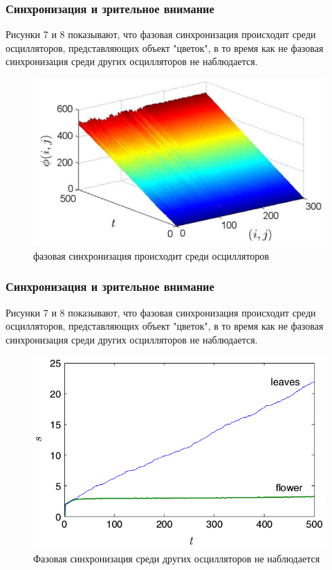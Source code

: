\documentclass{beamer}
\begin{document}

\begin{frame}
\frametitle{Синхронизация и зрительное внимание}

Рисунки 7 и 8 показывают, что фазовая синхронизация происходит среди осцилляторов, представляющих объект "цветок", в то время как не фазовая синхронизация среди других осцилляторов не наблюдается.

\begin{figure}
\includegraphics[scale=0.35]{img/7}
\caption{фазовая синхронизация происходит среди осцилляторов}
\end{figure}

\end{frame}


\begin{frame}
\frametitle{Синхронизация и зрительное внимание}

Рисунки 7 и 8 показывают, что фазовая синхронизация происходит среди осцилляторов, представляющих объект "цветок", в то время как не фазовая синхронизация среди других осцилляторов не наблюдается.

\begin{figure}
\includegraphics[scale=0.35]{img/8}
\caption{Фазовая синхронизация среди других осцилляторов не наблюдается}
\end{figure}

\end{frame}
\end{document}
